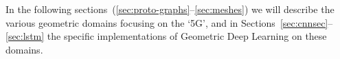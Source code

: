 In the following sections~(\ref{sec:proto-graphs}--\ref{sec:meshes}) we will describe the various geometric domains focusing on the `5G', and in Sections~\ref{sec:cnnsec}--\ref{sec:lstm} the  specific implementations of Geometric Deep Learning on these domains. 











